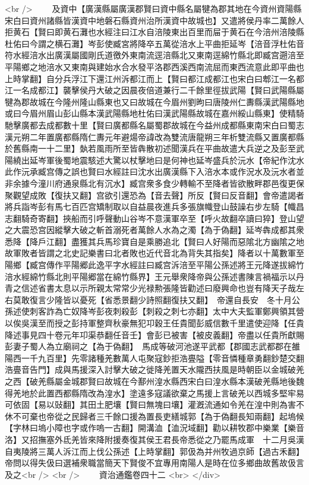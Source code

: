 <br />
　　及資中【廣漢縣屬廣漢郡賢曰資中縣名屬犍為郡其地在今資州資陽縣宋白曰資州諸縣皆漢資中地磐石縣資州治所漢資中故城也】又遣將侯丹率二萬餘人拒黄石【賢曰即黄石灘也水經注曰江水自涪陵東出百里而屇于黄石在今涪州涪陵縣杜佑曰今謂之横石灘】岑彭使臧宮將降卒五萬從涪水上平曲拒延岑【涪音浮杜佑音符水經涪水出廣漢屬國剛氏道徼外東南流逕涪縣北又東南逕綿竹縣北即臧宫遡涪至平陽鄉之地涪水又東南與建始水合水發平洛郡西溪西南流屈而東西流意此即平曲也上時掌翻】自分兵浮江下還江州泝都江而上【賢曰都江成都江也宋白曰郫江一名都江一名成都江】襲擊侯丹大破之因晨夜倍道兼行二千餘里徑拔武陽【賢曰武陽縣屬犍為郡故城在今隆州隆山縣東也又曰故城在今眉州劉昫曰唐陵州仁夀縣漢武陽縣地或曰今眉州眉山彭山縣本漢武陽縣地杜佑曰漢武陽縣故城在嘉州綏山縣東】使精騎馳擊廣都去成都數十里【賢曰廣都縣名屬蜀郡故城在今益州成都縣東南宋白曰蜀志漢元朔二年置廣都縣隋仁夀元年避煬帝諱改為雙流唐龍朔三年析雙流縣又置廣都縣於舊縣南一十二里】埶若風雨所至皆犇散初述聞漢兵在平曲故遣大兵逆之及彭至武陽繞出延岑軍後蜀地震駭述大驚以杖擊地曰是何神也延岑盛兵於沅水【帝紀作沈水此作沅承臧宫傳之誤也賢曰水經註曰沈水出廣漢縣下入涪水本或作況水及沅水者並非余據今潼川府通泉縣北有沉水】臧宫衆多食少轉輸不至降者皆欲散畔郡邑復更保聚觀望成敗【復扶又翻】宫欲引還恐為【音去聲】所反【賢曰反音翻】會帝遣謁者將兵詣岑彭有馬七百匹宫矯制取以自益晨夜進兵多張旗幟登山鼓譟右步左騎【幟昌志翻騎奇寄翻】挾船而引呼聲動山谷岑不意漢軍卒至【呼火故翻卒讀曰猝】登山望之大震恐宫因縱擊大破之斬首溺死者萬餘人水為之濁【為于偽翻】延岑犇成都其衆悉降【降戶江翻】盡獲其兵馬珍寶自是乘勝追北【賢曰人好陽而惡隂北方幽隂之地故軍敗者皆謂之北史記樂書曰北者敗也近代音北為背失其指矣】降者以十萬數軍至陽鄉【臧宫傳作平陽郷此逸平字水經註曰臧宫泝涪至平陽公孫述將王元降遂拔綿竹涪水經綿竹縣北則平陽郷當在綿竹縣界】王元舉衆降帝與公孫述書陳言禍福示以丹青之信述省書太息以示所親太常常少光禄勲張隆皆勸述曰廢興命也豈有降天子哉左右莫敢復言少隆皆以憂死【省悉景翻少詩照翻復扶又翻】　帝還自長安　冬十月公孫述使刺客詐為亡奴降岑彭夜刺殺彭【刺殺之刺七亦翻】太中大夫監軍鄭興領其營以俟吳漢至而授之彭持軍整齊秋豪無犯卭穀王任貴聞彭威信數千里遣使迎降【任貴降述事見四十卷元年卭渠恭翻任音壬】會彭已被害【被皮義翻】帝盡以任貴所獻賜彭妻子蜀人為立廟祠之【為于偽翻】　馬成等破河池遂平武都【郡國志武都郡在雒陽西一千九百里】先零諸種羌數萬人屯聚寇鈔拒浩亹隘【零音憐種章勇翻鈔楚交翻浩亹音告門】成與馬援深入討擊大破之徙降羌置天水隴西扶風是時朝臣以金城破羌之西【破羌縣屬金城郡賢曰故城在今鄯州湟水縣西宋白曰湟水縣本漢破羌縣地後魏得羌地於此置西都縣隋改為湟水】塗遠多寇議欲棄之馬援上言破羌以西城多堅牢易可依固【易以䜴翻】其田土肥壤【賢曰無塊曰壤】灌漑流通如令羌在湟中則為害不休不可棄也帝從之民歸者三千餘口援為置長吏繕城郭【為于偽翻長知兩翻】起塢候【字林曰塢小障也字或作嗚一古翻】開溝洫【洫況域翻】勸以耕牧郡中樂業【樂音洛】又招撫塞外氐羌皆來降附援奏復其侯王君長帝悉從之乃罷馬成軍　十二月吳漢自夷陵將三萬人泝江而上伐公孫述【上時掌翻】郭伋為并州牧過京師【過古禾翻】帝問以得失伋曰選補衆職當簡天下賢俊不宜專用南陽人是時在位多鄉曲故舊故伋言及之<br />
<br />
　　資治通鑑卷四十二  <br>
   </div> 

